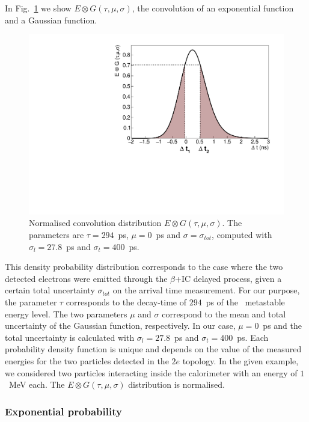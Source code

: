 In Fig.~\ref{fig:Pexp} we show $E \otimes G(\tau,\mu,\sigma)$, the convolution of an exponential function and a Gaussian function.
\begin{figure}[!h]
  \centering
  \includegraphics[width=13cm]{timedifference/fig_timediff/proba_expo.pdf}
  \caption{Normalised convolution distribution $E \otimes G (\tau,\mu,\sigma)$.
    The parameters are $\tau=294$~ps, $\mu=0$~ps and $\sigma=\sigma_{tot}$, computed with $\sigma_{l}=27.8$~ps and $\sigma_{t}=400$~ps.
    \label{fig:Pexp}}
\end{figure}
This density probability distribution corresponds to the case where the two detected electrons were emitted through the $\beta$+IC delayed process, given a certain total uncertainty $\sigma_{tot}$ on the arrival time measurement.
For our purpose, the parameter $\tau$ corresponds to the decay-time of $294$~ps of the \Tl\ metastable energy level.
The two parameters $\mu$ and $\sigma$ correspond to the mean and total uncertainty of the Gaussian function, respectively.
In our case, $\mu=0$~ps and the total uncertainty is calculated with $\sigma_{l}=27.8$~ps and $\sigma_{t}=400$~ps.
Each probability density function is unique and depends on the value of the measured energies for the two particles detected in the $2e$ topology.
In the given example, we considered two particles interacting inside the calorimeter with an energy of $1$~MeV each.
The $E \otimes G(\tau,\mu,\sigma)$ distribution is normalised.



\subsubsection{Exponential probability}

